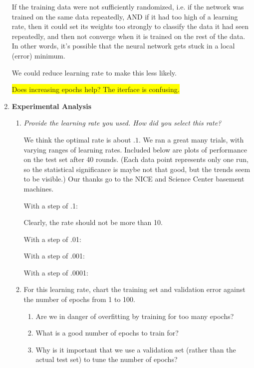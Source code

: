 \documentclass{article}
\newcommand{\edit}[1]{\colorbox{Yellow}{#1}}
\begin{document}
\begin{enumerate}
      If the training data were not sufficiently randomized, i.e.
      if the network was trained on the same data repeatedly,
      AND if it had too high of a learning rate, then it could 
      set its weights too strongly to classify the data it had 
      seen repeatedly, and then not converge when it is trained
      on the rest of the data. In other words, it's possible that
      the neural network gets stuck in a local (error) minimum.
      
      We could reduce learning rate to make this less likely. 

\edit{Does increasing epochs help? The iterface is confusing.}
  \item \textbf{Experimental Analysis}
    \begin{enumerate}
    \item \textit{Provide the learning rate you used. How did you
      select this rate?}

      We think the optimal rate is about $.1$. We ran a great many
      trials, with varying ranges of learning rates. Included below
      are plots of performance on the test set after 40 rounds. (Each
      data point represents only one run, so the statistical
      significance is maybe not that good, but the trends seem to be
      visible.) Our thanks go to the NICE and Science Center basement
      machines.


      With a step of .1:

      Clearly, the rate should not be more than 10.

      With a step of .01:

      With a step of .001:

      With a step of .0001:


    \item For this learning rate, chart the training set and validation error
      against the number of epochs from 1 to 100. 

      \begin{enumerate}
      \item Are we in danger of overfitting by training for too many epochs?


      \item What is a good number of epochs to train for?


      \item Why is it important that we use a validation set (rather than the
        actual test set) to tune the number of epochs?


\end{enumerate}
\end{enumerate}
\end{enumerate}
\end{document}
